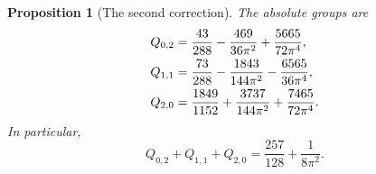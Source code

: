 \documentclass[a4paper,10pt]{article}
\numberwithin{equation}{section}
\theoremstyle{paperplain}
\newtheorem{prp}[thm]{Proposition}
\theoremstyle{paperremark}
\theoremstyle{paperplain}
\begin{document}
\begin{prp}[The second correction]\label{prp:s04:second-correction}
The absolute groups are
\begin{align}
 Q_{0,2}&=\frac{43}{288}-\frac{469}{36\pi^2}
                                      +\frac{5665}{72\pi^4},\notag\\
 Q_{1,1}&=\frac{73}{288}-\frac{1843}{144\pi^2}
                                      -\frac{6565}{36\pi^4},\notag\\
 Q_{2,0}&=\frac{1849}{1152}+\frac{3737}{144\pi^2}
                                      +\frac{7465}{72\pi^4}.
 \label{eq:s04:second-groups}
\end{align}
In particular,
\begin{equation}\label{eq:s04:second-total}
 Q_{0,2}+Q_{1,1}+Q_{2,0}=\frac{257}{128}+\frac1{8\pi^2}.
\end{equation}
\end{prp}
\end{document}
